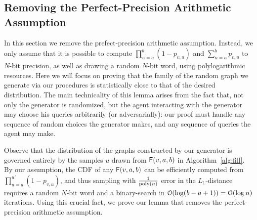 \subsection{Removing the Perfect-Precision Arithmetic Assumption}\label{sec:remove-perfect}

In this section we remove the prefect-precision arithmetic assumption. Instead, we only assume that it is possible to compute $\prod_{u=a}^b (1-p_{v,u})$ and $\sum_{u=a}^b p_{v,u}$ to $N$-bit precision, as well as drawing a random $N$-bit word, using polylogarithmic resources. Here we will focus on proving that the family of the random graph we generate via our procedures is statistically close to that of the desired distribution. The main technicality of this lemma arises from the fact that, not only the generator is randomized, but the agent interacting with the generator may choose his queries arbitrarily (or adversarially): our proof must handle any sequence of random choices the generator makes, and any sequence of queries the agent may make.

Observe that the distribution of the graphs constructed by our generator is governed entirely by the samples $u$ drawn from $\mathsf{F}(v,a,b)$ in Algorithm~\ref{alg:fill}. By our assumption, the CDF of any $\mathsf{F}(v,a,b)$ can be efficiently computed from $\prod_{u=a}^{u'} (1-p_{v,u})$, and thus sampling with $\frac{1}{\mathrm{poly}(n)}$ error in the $L_1$-distance requires a random $N$-bit word and a binary-search in $\mathcal{O}(\log (b-a+1)) = \mathcal{O}(\log n)$ iterations. Using this crucial fact, we prove our lemma that removes the perfect-precision arithmetic assumption.


